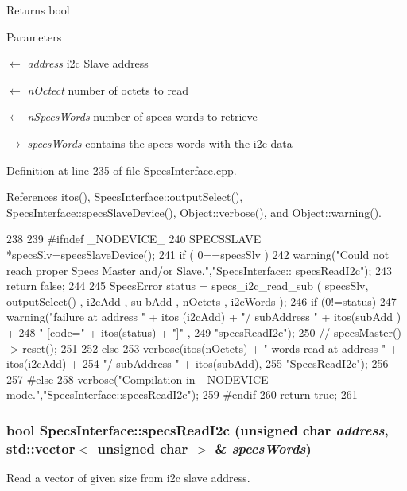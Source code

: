 \begin{DoxyReturn}{Returns}
bool 
\end{DoxyReturn}

\begin{DoxyParams}{Parameters}
\item[\mbox{$\leftarrow$} {\em address}]i2c Slave address \item[\mbox{$\leftarrow$} {\em nOctect}]number of octets to read \item[\mbox{$\leftarrow$} {\em nSpecsWords}]number of specs words to retrieve \item[\mbox{$\rightarrow$} {\em specsWords}]contains the specs words with the i2c data \end{DoxyParams}


Definition at line 235 of file SpecsInterface.cpp.

References itos(), SpecsInterface::outputSelect(), SpecsInterface::specsSlaveDevice(), Object::verbose(), and Object::warning().


\begin{DoxyCode}
238                                              {
239 #ifndef _NODEVICE_
240   SPECSSLAVE *specsSlv=specsSlaveDevice();
241   if ( 0==specsSlv ){
242     warning("Could not reach proper Specs Master and/or Slave.","SpecsInterface::
      specsReadI2c");
243     return false;
244   }
245   SpecsError status = specs_i2c_read_sub ( specsSlv, outputSelect() , i2cAdd , su
      bAdd , nOctets , i2cWords );
246   if (0!=status){
247     warning("failure at address " + itos (i2cAdd) + "/ subAddress " + itos(subAdd
      ) +
248             " [code=" + itos(status) + "]" ,
249             "specsReadI2c");
250     //    specsMaster() -> reset();
251   }
252   else {
253     verbose(itos(nOctets) + " words read at address " + itos(i2cAdd) +
254             "/ subAddress " + itos(subAdd),
255             "SpecsReadI2c");
256   }
257 #else
258   verbose("Compilation in _NODEVICE_ mode.","SpecsInterface::specsReadI2c");
259 #endif
260   return true;
261 }
\end{DoxyCode}
\hypertarget{classSpecsInterface_ab61d866ec9b8a48e84a867004c1ed662}{
\subsubsection[{specsReadI2c}]{\setlength{\rightskip}{0pt plus 5cm}bool SpecsInterface::specsReadI2c (unsigned char {\em address}, \/  std::vector$<$ unsigned char $>$ \& {\em specsWords})}}
\label{classSpecsInterface_ab61d866ec9b8a48e84a867004c1ed662}
Read a vector of given size from i2c slave address.

